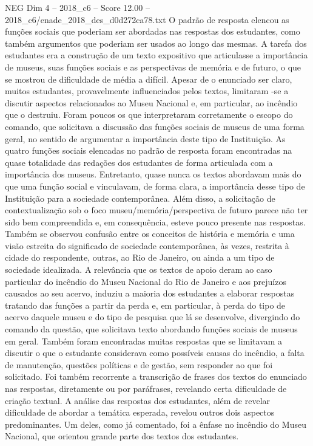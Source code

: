 \begin{textsample}{NEG Dim 4 – 2018\_c6 – Score 12.00 – 2018\_c6/enade\_2018\_des\_d0d272ca78.txt}
O padrão de resposta elencou as funções sociais que poderiam ser abordadas nas respostas dos estudantes, como também argumentos que poderiam ser usados ao longo das mesmas.
A tarefa dos estudantes era a construção de um texto expositivo que articulasse a importância de museus, suas funções sociais e as perspectivas de memória e de futuro, o que se mostrou de dificuldade de média a difícil.
Apesar de o enunciado ser claro, muitos estudantes, provavelmente influenciados pelos textos, limitaram -se a discutir aspectos relacionados ao Museu Nacional e, em particular, ao incêndio que o destruiu.
Foram poucos os que interpretaram corretamente o escopo do comando, que solicitava a discussão das funções sociais de museus de uma forma geral, no sentido de argumentar a importância deste tipo de Instituição.
As quatro funções sociais elencadas no padrão de resposta foram encontradas na quase totalidade das redações dos estudantes de forma articulada com a importância dos museus.
Entretanto, quase nunca os textos abordavam mais do que uma função social e vinculavam, de forma clara, a importância desse tipo de Instituição para a sociedade contemporânea.
Além disso, a solicitação de contextualização sob o foco museu/memória/perspectiva de futuro parece não ter sido bem compreendida e, em consequência, esteve pouco presente nas respostas.
Também se observou confusão entre os conceitos de história e memória e uma visão estreita do significado de sociedade contemporânea, às vezes, restrita à cidade do respondente, outras, ao Rio de Janeiro, ou ainda a um tipo de sociedade idealizada.
A relevância que os textos de apoio deram ao caso particular do incêndio do Museu Nacional do Rio de Janeiro e aos prejuízos causados ao seu acervo, induziu a maioria dos estudantes a elaborar respostas tratando das funções a partir da perda e, em particular, à perda do tipo de acervo daquele museu e do tipo de pesquisa que lá se desenvolve, divergindo do comando da questão, que solicitava texto abordando funções sociais de museus em geral.
Também foram encontradas muitas respostas que se limitavam a discutir o que o estudante considerava como possíveis causas do incêndio, a falta de manutenção, questões políticas e de gestão, sem responder ao que foi solicitado.
Foi também recorrente a transcrição de frases dos textos do enunciado nas respostas, diretamente ou por paráfrases, revelando certa dificuldade de criação textual.
A análise das respostas dos estudantes, além de revelar dificuldade de abordar a temática esperada, revelou outros dois aspectos predominantes.
Um deles, como já comentado, foi a ênfase no incêndio do Museu Nacional, que orientou grande parte dos textos dos estudantes.

\end{textsample}
